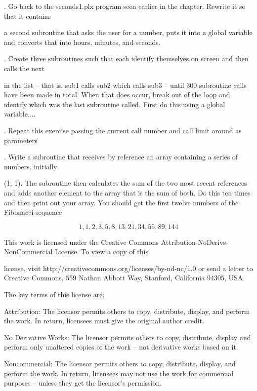 \documentclass[a4paper,11pt]{book}
\begin{document}
.   Go back to the seconds1.plx program seen earlier in the chapter. Rewrite it so that it contains

\noindent a second subroutine that asks the user for a number, puts it into a global variable and converts that into hours, minutes, and seconds.

\noindent 

.   Create three subroutines such that each identify themselves on screen and then calls the next

\noindent in the list -- that is, sub1 calls sub2 which calls sub3  -- until 300 subroutine calls have been made in total. When that does occur, break out of the loop and identify which was the last subroutine called. First do this using a global variable....

\noindent 

.   Repeat this exercise passing the current call number and call limit around as parameters

\noindent 

.   Write a subroutine that receives by reference an array containing a series of numbers, initially

\noindent (1, 1). The subroutine then calculates the sum of the two most recent references and adds another element to the array that is the sum of both. Do this ten times and then print out your array. You should get the first twelve numbers of the Fibonacci sequence

\noindent 

\noindent 

\[1, 1, 2, 3, 5, 8, 13, 21, 34, 55, 89, 144\] 
 

\noindent  

\noindent  

\noindent  

\noindent 

\noindent 

\noindent 

\noindent This work is licensed under the Creative Commons Attribution-NoDerivs-NonCommercial License. To view a copy of this

\noindent license, visit http://creativecommons.org/licenses/by-nd-nc/1.0 or send a letter to Creative Commons, 559 Nathan Abbott Way, Stanford, California 94305, USA.

\noindent 

\noindent The key terms of this license are:

\noindent 

\noindent Attribution: The licensor permits others to copy, distribute, display, and perform the work. In return, licensees must give the original author credit.

\noindent 

\noindent No  Derivative  Works: The licensor permits others to copy, distribute, display and perform only unaltered copies of the work -- not derivative works based on it.

\noindent 

\noindent Noncommercial: The licensor permits others to copy, distribute, display, and perform the work. In return, licensees may not use the work for commercial purposes -- unless they get the licensor's permission.
\end{document}
